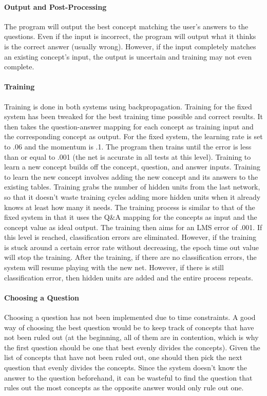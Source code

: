 \documentclass[12pt]{article}
\begin{document}
\paragraph*{Output and Post-Processing}
The program will output the best concept matching the user's answers to the questions. Even if the input is incorrect, the program will output what it thinks is the correct answer (usually wrong). However, if the input completely matches an existing concept's input, the output is uncertain and training may not even complete.

\paragraph*{Training}
Training is done in both systems using backpropagation. Training for the fixed system has been tweaked for the best training time possible and correct results. It then takes the question-answer mapping for each concept as training input and the corresponding concept as output. For the fixed system, the learning rate is set to .06 and the momentum is .1. The program then trains until the error is less than or equal to .001 (the net is accurate in all tests at this level).
Training to learn a new concept builds off the concept, question, and answer inputs. Training to learn the new concept involves adding the new concept and its answers to the existing tables. Training grabs the number of hidden units from the last network, so that it doesn't waste training cycles adding more hidden units when it already knows at least how many it needs. The training process is similar to that of the fixed system in that it uses the Q&A mapping for the concepts as input and the concept value as ideal output. The training then aims for an LMS error of .001. If this level is reached, classification errors are eliminated. However, if the training is stuck around a certain error rate without decreasing, the epoch time out value will stop the training. After the training, if there are no classification errors, the system will resume playing with the new net. However, if there is still classification error, then hidden units are added and the entire process repeats.

\paragraph*{Choosing a Question}
Choosing a question has not been implemented due to time constraints. A good way of choosing the best question would be to keep track of concepts that have not been ruled out (at the beginning, all of them are in contention, which is why the first question should be one that best evenly divides the concepts). Given the list of concepts that have not been ruled out, one should then pick the next question that evenly divides the concepts. Since the system doesn't know the answer to the question beforehand, it can be wasteful to find the question that rules out the most concepts as the opposite answer would only rule out one. 
\end{document}
